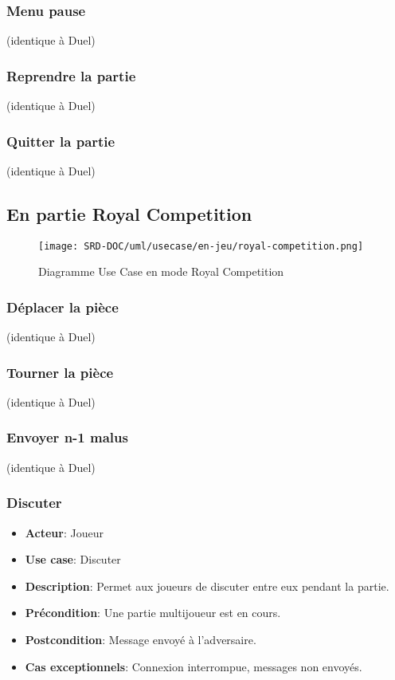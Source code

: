 \documentclass{article}
\begin{document}
\subsubsection*{Menu pause} (identique à Duel)
\subsubsection*{Reprendre la partie} (identique à Duel)
\subsubsection*{Quitter la partie} (identique à Duel)

\subsection{En partie Royal Competition}

\begin{figure}[H]
    \centering
    \texttt{[image: SRD-DOC/uml/usecase/en-jeu/royal-competition.png]}
    \caption{Diagramme Use Case en mode Royal Competition}
    \label{fig:Royal-Competition}
\end{figure}

\subsubsection*{Déplacer la pièce} (identique à Duel)
\subsubsection*{Tourner la pièce} (identique à Duel)
\subsubsection*{Envoyer n-1 malus} (identique à Duel)

\subsubsection*{Discuter}
\begin{itemize}
    \item \textbf{Acteur}: Joueur
    \item \textbf{Use case}: Discuter
    \item \textbf{Description}: Permet aux joueurs de discuter entre eux pendant la partie.
    \item \textbf{Précondition}: Une partie multijoueur est en cours.
    \item \textbf{Postcondition}: Message envoyé à l'adversaire.
    \item \textbf{Cas exceptionnels}: Connexion interrompue, messages non envoyés.
\end{itemize}
\end{document}
